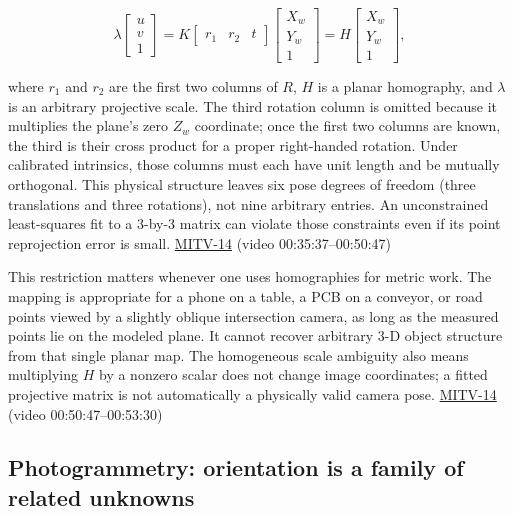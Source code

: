 \[
\lambda\begin{bmatrix}u\\v\\1\end{bmatrix}=K\begin{bmatrix}r_1&r_2&t\end{bmatrix}\begin{bmatrix}X_w\\Y_w\\1\end{bmatrix}=H\begin{bmatrix}X_w\\Y_w\\1\end{bmatrix},
\]

where \(r_1\) and \(r_2\) are the first two columns of \(R\), \(H\) is a planar homography, and \(\lambda\) is an arbitrary projective scale. The third rotation column is omitted because it multiplies the plane's zero \(Z_w\) coordinate; once the first two columns are known, the third is their cross product for a proper right-handed rotation. Under calibrated intrinsics, those columns must each have unit length and be mutually orthogonal. This physical structure leaves six pose degrees of freedom (three translations and three rotations), not nine arbitrary entries. An unconstrained least-squares fit to a 3-by-3 matrix can violate those constraints even if its point reprojection error is small. \hyperref[04-visual-computing-ii-ch036-mitv-14---inspection-in-patquick-hough-transform-homography-position-determination-multi-scale]{MITV-14} (video 00:35:37--00:50:47)

This restriction matters whenever one uses homographies for metric work. The mapping is appropriate for a phone on a table, a PCB on a conveyor, or road points viewed by a slightly oblique intersection camera, as long as the measured points lie on the modeled plane. It cannot recover arbitrary 3-D object structure from that single planar map. The homogeneous scale ambiguity also means multiplying \(H\) by a nonzero scalar does not change image coordinates; a fitted projective matrix is not automatically a physically valid camera pose. \hyperref[04-visual-computing-ii-ch036-mitv-14---inspection-in-patquick-hough-transform-homography-position-determination-multi-scale]{MITV-14} (video 00:50:47--00:53:30)

\subsection{Photogrammetry: orientation is a family of related unknowns}\label{04-visual-computing-ii-ch032-photogrammetry-orientation-is-a-family-of-related-unknowns}


